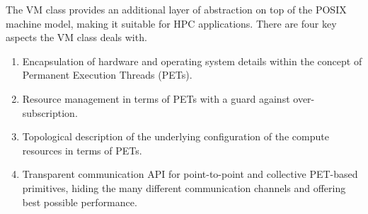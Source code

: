

The VM class provides an additional layer of abstraction on top of the POSIX machine model, making it suitable for HPC applications. There are four key aspects the VM class deals with.

\begin{enumerate}

\item Encapsulation of hardware and operating system details within the concept of Permanent Execution Threads (PETs).

\item Resource management in terms of PETs with a guard against over-subscription.

\item Topological description of the underlying configuration of the compute resources in terms of PETs.

\item Transparent communication API for point-to-point and collective PET-based primitives, hiding the many different communication channels and offering best possible performance.

\end{enumerate}

\begin{center}
\end{center}



